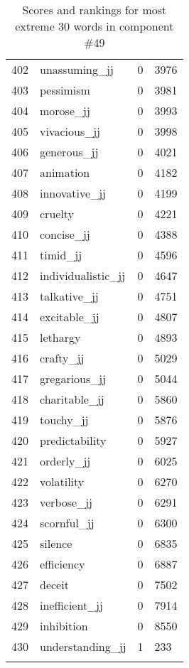 \begin{longtable}[!htbp]{| rlr@{.}l |}
    402 & unassuming\_jj & 0 & 3976 \\
    403 & pessimism & 0 & 3981 \\
    404 & morose\_jj & 0 & 3993 \\
    405 & vivacious\_jj & 0 & 3998 \\
    406 & generous\_jj & 0 & 4021 \\
    407 & animation & 0 & 4182 \\
    408 & innovative\_jj & 0 & 4199 \\
    409 & cruelty & 0 & 4221 \\
    410 & concise\_jj & 0 & 4388 \\
    411 & timid\_jj & 0 & 4596 \\
    412 & individualistic\_jj & 0 & 4647 \\
    413 & talkative\_jj & 0 & 4751 \\
    414 & excitable\_jj & 0 & 4807 \\
    415 & lethargy & 0 & 4893 \\
    416 & crafty\_jj & 0 & 5029 \\
    417 & gregarious\_jj & 0 & 5044 \\
    418 & charitable\_jj & 0 & 5860 \\
    419 & touchy\_jj & 0 & 5876 \\
    420 & predictability & 0 & 5927 \\
    421 & orderly\_jj & 0 & 6025 \\
    422 & volatility & 0 & 6270 \\
    423 & verbose\_jj & 0 & 6291 \\
    424 & scornful\_jj & 0 & 6300 \\
    425 & silence & 0 & 6835 \\
    426 & efficiency & 0 & 6887 \\
    427 & deceit & 0 & 7502 \\
    428 & inefficient\_jj & 0 & 7914 \\
    429 & inhibition & 0 & 8550 \\
    430 & understanding\_jj & 1 & 233 \\
    \hline
    \caption{Scores and rankings for most extreme 30 words in component \#49} \\
\end{longtable}
